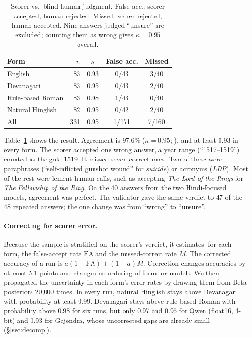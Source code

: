 \documentclass[11pt]{article}
\newcommand{\Dev}{Devanagari}
\newcommand{\Rom}{rule-based Roman}
\newcommand{\Hng}{natural Hinglish}
\newcommand{\HngC}{Natural Hinglish}
\newcommand{\RomC}{Rule-based Roman}
\begin{document}
\begin{table}[t]
\centering\small
\begin{tabular}{@{}lrccc@{}}
\toprule
Form & $n$ & $\kappa$ & False acc. & Missed \\
\midrule
English & 83 & 0.93 & 0/43 & 3/40 \\
\Dev{} & 83 & 0.95 & 0/43 & 2/40 \\
\RomC{} & 83 & 0.98 & 1/43 & 0/40 \\
\HngC{} & 82 & 0.95 & 0/42 & 2/40 \\
\midrule
All & 331 & 0.95 & 1/171 & 7/160 \\
\bottomrule
\end{tabular}
\caption{Scorer vs.\ blind human judgment. False acc.: scorer accepted, human rejected. Missed: scorer rejected, human accepted. Nine answers judged ``unsure'' are excluded; counting them as wrong gives $\kappa = 0.95$ overall.}
\label{tab:validation}
\end{table}

Table~\ref{tab:validation} shows the result.
Agreement is 97.6\% ($\kappa = 0.95$; \citealp{cohen1960kappa}), and at least 0.93 in every form.
The scorer accepted one wrong answer, a year range (``1517--1519'') counted as the gold 1519.
It missed seven correct ones.
Two of these were paraphrases (``self-inflicted gunshot wound'' for \emph{suicide}) or acronyms (\emph{LDP}).
Most of the rest were lenient human calls, such as accepting \emph{The Lord of the Rings} for \emph{The Fellowship of the Ring}.
On the 40 answers from the two Hindi-focused models, agreement was perfect.
The validator gave the same verdict to 47 of the 48 repeated answers; the one change was from ``wrong'' to ``unsure''.

\paragraph{Correcting for scorer error.}
Because the sample is stratified on the scorer's verdict, it estimates, for each form, the false-accept rate $\mathrm{FA}$ and the missed-correct rate $M$.
The corrected accuracy of a run is $a(1-\mathrm{FA}) + (1-a)M$.
Correction changes accuracies by at most 5.1 points and changes no ordering of forms or models.
We then propagated the uncertainty in each form's error rates by drawing them from Beta posteriors 20{,}000 times.
In every run, \Hng{} stays above \Dev{} with probability at least 0.99.
\Dev{} stays above \Rom{} with probability above 0.98 for six runs, but only 0.97 and 0.96 for Qwen (float16, 4-bit) and 0.93 for Gajendra, whose uncorrected gaps are already small (\S\ref{sec:decomp}).
\end{document}
